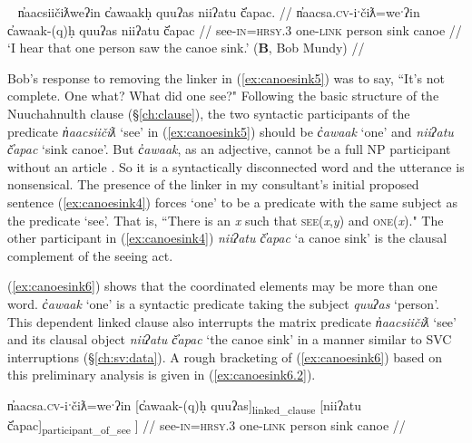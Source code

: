 \ex~ \label{ex:canoesink6}
\begingl
\glpreamble n̓aacsiičiƛweʔin c̓awaakḥ quuʔas niiʔatu č̓apac. //
\gla n̓aacsa.\textsc{cv}-iˑčiƛ=weˑʔin c̓awaak-(q)ḥ quuʔas niiʔatu č̓apac //
\glb see-\textsc{in}=\textsc{hrsy.3} one-\textsc{link} person sink canoe //
\glft `I hear that one person saw the canoe sink.' (\textbf{B}, Bob Mundy) //
\endgl
\xe

Bob's response to removing the linker in (\ref{ex:canoesink5}) was to say, ``It's not complete. One what? What did one see?" Following the basic structure of the Nuuchahnulth clause (\S\ref{ch:clause}), the two syntactic participants of the predicate \textit{n̓aacsiičiƛ} `see' in (\ref{ex:canoesink5}) should be \textit{c̓awaak} `one' and \textit{niiʔatu č̓apac} `sink canoe'. But \textit{c̓awaak}, as an adjective, cannot be a full NP participant without an article \citep{jacobsen1979}. So it is a syntactically disconnected word and the utterance is nonsensical. The presence of the linker in my consultant's initial proposed sentence (\ref{ex:canoesink4}) forces `one' to be a predicate with the same subject as the predicate `see'. That is, ``There is an \textit{x} such that \textsc{see}(\textit{x},\textit{y}) and \textsc{one}(\textit{x})." The other participant in (\ref{ex:canoesink4}) \textit{niiʔatu č̓apac} `a canoe sink' is the clausal complement of the seeing act.

(\ref{ex:canoesink6}) shows that the coordinated elements may be more than one word. \textit{c̓awaak} `one' is a syntactic predicate taking the subject \textit{quuʔas} `person'.  This dependent linked clause also interrupts the matrix predicate \textit{n̓aacsiičiƛ} `see' and its clausal object \textit{niiʔatu č̓apac} `the canoe sink' in a manner similar to SVC interruptions (\S\ref{ch:sv:data}). A rough bracketing of (\ref{ex:canoesink6}) based on this preliminary analysis is given in (\ref{ex:canoesink6.2}).

\ex \label{ex:canoesink6.2}
\begingl
\gla {[}n̓aacsa.\textsc{cv}-iˑčiƛ=weˑʔin {[}c̓awaak-(q)ḥ quuʔas{]\textsubscript{linked\_clause}} {[}niiʔatu č̓apac{]\textsubscript{participant\_of\_see} ]} //
\glb see-\textsc{in}=\textsc{hrsy.3} one-\textsc{link} person sink canoe //
\endgl
\xe

